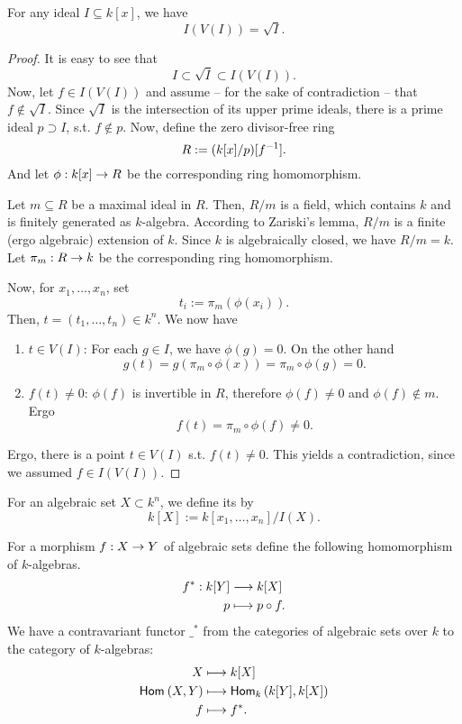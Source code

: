 \begin{theorem}
	For any ideal $I \subseteq k[x]$, we have
	\[ I(V(I)) = \sqrt{I}.\]
\end{theorem}
\begin{proof}
	It is easy to see that
	\[ I \subset \sqrt{I} \subset I(V(I)). \]
	Now, let $f \in I(V(I))$ and assume -- for the sake of contradiction -- that $f \notin \sqrt{I}$. Since $\sqrt{I}$ is the intersection of its upper prime ideals, there is a prime ideal $p \supset I$, s.t. $f\notin p$. Now, define the zero divisor-free ring
	\[ R:= (k[x] / p)[f^{-1}]. \]
	And let $\phi : k[x] \overset{}{\rightarrow} R$ be the corresponding ring homomorphism.
	
	Let $m \subseteq R$ be a maximal ideal in $R$. Then, $R/m$ is a field, which contains $k$ and is finitely generated as $k$-algebra. According to Zariski's lemma, $R / m$ is a finite (ergo algebraic) extension of $k$.
	Since $k$ is algebraically closed, we have $R / m = k$. Let $\pi_m : R \overset{}{\rightarrow} k$ be the corresponding ring homomorphism.
	
	Now, for $x_1,\ldots, x_n$, set
	\[ t_i := \pi_m(\phi(x_i)). \]
	Then, $t = (t_1,\ldots, t_n) \in k^n$. We now have
	\begin{enumerate}
		\item $t \in V(I)$:
		For each $g \in I$, we have $\phi(g) = 0$. On the other hand
		\[ g(t) = g(\pi_m\circ \phi(x)) = \pi_m\circ \phi(g) = 0. \]
		\item $f(t) \neq 0$:
		$\phi(f)$ is invertible in $R$, therefore $\phi(f) \neq 0$ and $\phi(f) \notin m$. Ergo
		\[ f(t) = \pi_m \circ \phi(f) \neq 0. \]
	\end{enumerate}
Ergo, there is a point $t \in V(I)$ s.t. $f(t) \neq 0$. This yields a contradiction, since we assumed $f \in I(V(I))$.
\end{proof}
\begin{definition}
	For an algebraic set $X \subset k^n$, we define its  by
	\[ k[X] := k[x_1,\ldots, x_n] / I(X). \]
\end{definition}

\begin{lemma}
	For a morphism $f : X \overset{}{\rightarrow} Y$ of algebraic sets define the following homomorphism of $k$-algebras.
	\begin{align*}
	f^* : k[Y] & \overset{}{\longrightarrow} k[X]\\
	p & \longmapsto p \circ f.
	\end{align*}
	We have a contravariant functor $\_^*$ from the categories of algebraic sets over $k$ to the category of $k$-algebras:
	\begin{align*}
	X &\longmapsto k[X]\\
	\textsf{Hom}_{}\left(X, Y\right) & \longmapsto \textsf{Hom}_{k}\left(k[Y], k[X]\right)\\
	f & \longmapsto f^*.
	\end{align*}
\end{lemma}

